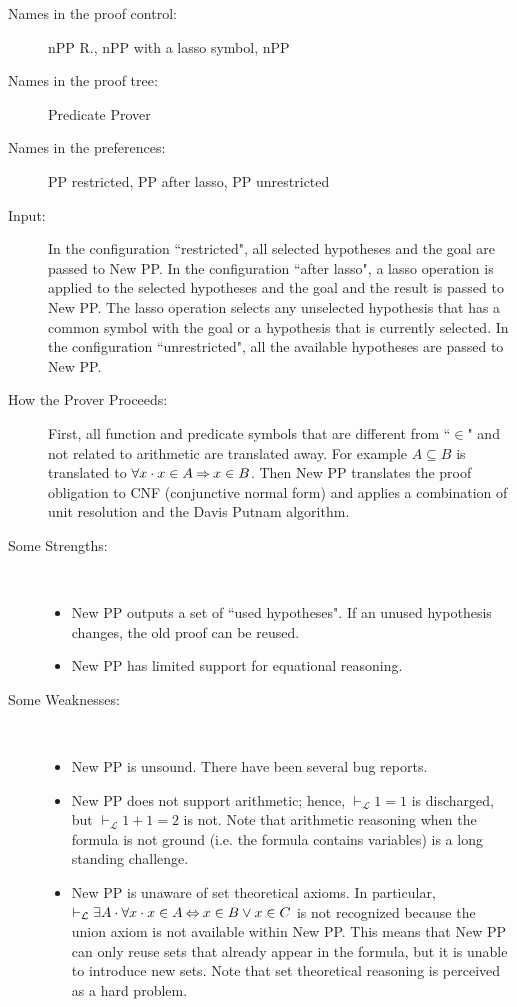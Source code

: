 \begin{description}
	\item[Names in the proof control:] nPP R., nPP with a lasso symbol, nPP
	\item[Names in the proof tree:] Predicate Prover
	\item[Names in the preferences:] PP restricted, PP after lasso, PP unrestricted
	\item[Input:] In the configuration ``restricted", all selected hypotheses and the goal are passed to New PP. In the configuration ``after lasso", a lasso operation is applied to the selected hypotheses and the goal and the result is passed to New PP. The lasso operation selects any unselected hypothesis that has a common symbol with the goal or a hypothesis that is currently selected. In the configuration ``unrestricted", all the available hypotheses are passed to New PP.
	\item[How the Prover Proceeds:] First, all function and predicate symbols that are different from ``$\in$" and not related to arithmetic are translated away. For example $A \subseteq B$ is translated to $\forall x\cdot x \in A \mathbin\Rightarrow x \in B$. Then New PP translates the proof obligation to CNF (conjunctive normal form) and applies a combination of unit resolution and the Davis Putnam algorithm.
	\item[Some Strengths:] ~
	\begin{itemize}
		\item New PP outputs a set of ``used hypotheses". If an unused hypothesis changes, the old proof can be reused.
		\item New PP has limited support for equational reasoning. 
	\end{itemize}
	\item[Some Weaknesses:] ~
	\begin{itemize}
		\item New PP is unsound. There have been several bug reports.
		\item New PP does not support arithmetic; hence, $\vdash_{\mathcal L} 1=1$ is discharged, but $\vdash_{\mathcal L} 1+1=2$ is not. Note that arithmetic 	reasoning when the formula is not ground (i.e. the formula contains variables) is a long standing challenge.
		\item New PP is unaware of set theoretical axioms. In particular, $\vdash_{\mathcal L} \exists A\cdot \forall x\cdot x \in A \mathbin\Leftrightarrow x \in B \lor x \in C$ is not recognized because the union axiom is not available within New PP. This means that New PP can only reuse sets that already appear in the formula, but it is unable to introduce new sets. Note that set theoretical reasoning is perceived as a hard problem.

\end{itemize}
\end{description}

